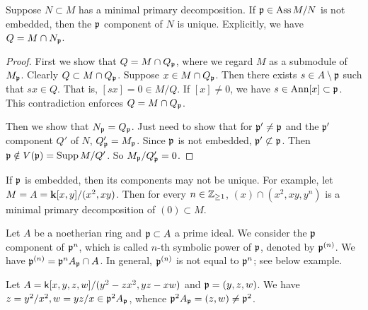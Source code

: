         \begin{proposition}\label{prop: uniqueness of primary components}
            Suppose $N\subset M$ has a minimal primary decomposition.
            If ${\mathfrak{p}} \in \operatorname{Ass} M/N$ is not embedded, then the ${\mathfrak{p}}$ component of $N$ is unique.
            Explicitly, we have $Q = M \cap N_{\mathfrak{p}}$.
        \end{proposition}
        \begin{proof}
            First we show that $Q = M \cap Q_{\mathfrak{p}}$, where we regard $M$ as a submodule of $M_{\mathfrak{p}}$.
            Clearly $Q \subset M \cap Q_{\mathfrak{p}}$.
            Suppose $x \in M \cap Q_{\mathfrak{p}}$.
            Then there exists $s \in A \setminus {\mathfrak{p}}$ such that $sx \in Q$.
            That is, $[sx] = 0 \in M/Q$.
            If $[x] \neq 0$, we have $s \in \operatorname{Ann} [x] \subset {\mathfrak{p}}$.
            This contradiction enforces $Q = M \cap Q_{\mathfrak{p}}$.

            Then we show that $N_{\mathfrak{p}} = Q_{\mathfrak{p}}$.
            Just need to show that for ${\mathfrak{p}}' \neq {\mathfrak{p}}$ and the ${\mathfrak{p}}'$ component $Q'$ of $N$, $Q'_{\mathfrak{p}} = M_{\mathfrak{p}}$.
            Since ${\mathfrak{p}}$ is not embedded, ${\mathfrak{p}}' \not\subset {\mathfrak{p}}$.
            Then ${\mathfrak{p}} \notin V({\mathfrak{p}}) = \operatorname{Supp} M/Q'$.
            So $M_{\mathfrak{p}}/Q'_{\mathfrak{p}} = 0$.
        \end{proof}

        \begin{example}
            If ${\mathfrak{p}}$ is embedded, then its components may not be unique.
            For example, let $M = A = {\mathbf{k}}[x,y]/(x^2,xy)$.
            Then for every $n \in {\mathbb{Z}}_{\geq 1}$, $(x) \cap (x^2,xy,y^n)$ is a minimal primary decomposition of $(0) \subset M$.
        \end{example}

        Let $A$ be a noetherian ring and ${\mathfrak{p}} \subset A$ a prime ideal.
        We consider the ${\mathfrak{p}}$ component of ${\mathfrak{p}}^n$, which is called $n$-th symbolic power of ${\mathfrak{p}}$, denoted by ${\mathfrak{p}}^{(n)}$.
        We have ${\mathfrak{p}}^{(n)} = {\mathfrak{p}}^nA_{\mathfrak{p}} \cap A$.
        In general, ${\mathfrak{p}}^{(n)}$ is not equal to ${\mathfrak{p}}^n$; see below example.

        \begin{example}
            Let $A = {\mathsf{k}}[x,y,z,w]/(y^2-zx^2,yz-xw)$ and ${\mathfrak{p}} = (y,z,w)$.
            We have $z = y^2/x^2,w = yz/x \in {\mathfrak{p}}^2 A_{\mathfrak{p}}$, whence ${\mathfrak{p}}^2 A_{\mathfrak{p}} = (z,w) \neq {\mathfrak{p}}^2$.
        \end{example}
        
